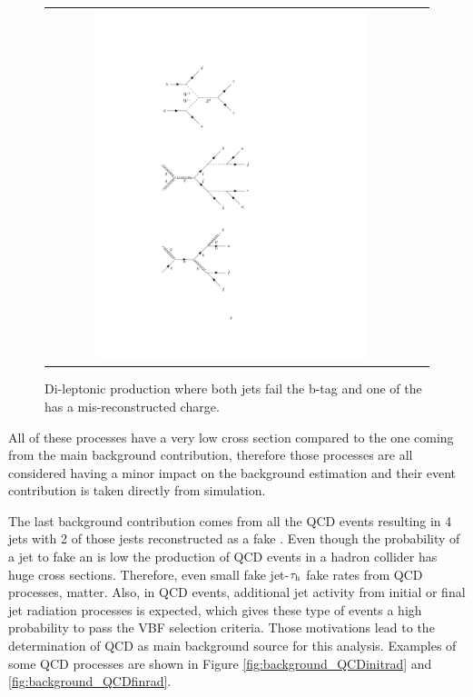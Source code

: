 \begin{figure}[tbh!]
	\centering
	\begin{tabular}{cc}
		\includegraphics[width=0.75\textwidth]{diagrams/pics/background_ttbar.pdf}
	\end{tabular}
	\caption{Di-leptonic \ttbar production where both jets fail the b-tag and one of the \hadtau has a mis-reconstructed charge.}
	\label{fig:background_ttbar}
\end{figure}

All of these processes have a very low cross section compared to the one coming from the main background contribution, therefore those processes are all considered having a minor impact on the background estimation and their event contribution is taken directly from simulation.

The last background contribution comes from all the QCD events resulting in 4 jets with 2 of those jests reconstructed as a fake \hadtau. Even though the probability of a jet to fake an \hadtau is low the production of QCD events in a hadron collider has huge cross sections. Therefore, even small fake jet-$\tau_{\text{h}}$ fake rates from QCD processes, matter. Also, in QCD events, additional jet activity from initial or final jet radiation processes is expected, which gives these type of events a high probability to pass the VBF selection criteria. Those motivations lead to the determination of QCD as main background source for this analysis. Examples of some QCD processes are shown in Figure \ref{fig:background_QCDinitrad} and \ref{fig:background_QCDfinrad}.


